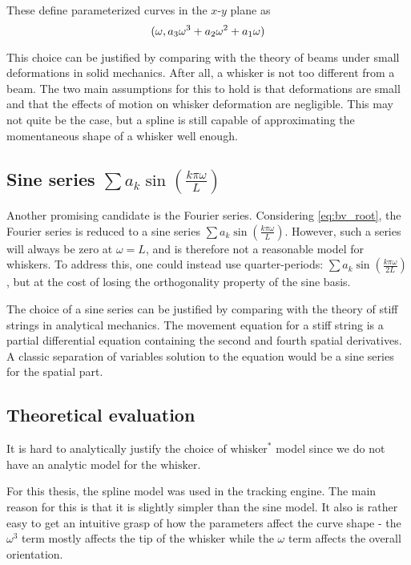 These define parameterized curves in the $x$-$y$ plane as
\begin{equation}
  (\omega,a_3\omega^3+a_2\omega^2+a_1\omega)
\end{equation}

This choice can be justified by comparing with the theory of beams
under small deformations in solid mechanics. After all, a whisker is
not too different from a beam. The two main assumptions for this to
hold is that deformations are small and that the effects of motion on
whisker deformation are negligible. \cite{Hallfasthet} This may not
quite be the case, but a spline is still capable of approximating the
momentaneous shape of a whisker well enough.

\subsection{Sine series $\sum a_k\sin \left(\frac{k\pi\omega}{L}\right)$}
Another promising candidate is the Fourier series. Considering
\eqref{eq:bv_root}, the Fourier series is reduced to a sine series
$\sum a_k\sin \left(\frac{k\pi\omega}{L}\right)$. However, such a
series will always be zero at $\omega = L$, and is therefore not a
reasonable model for whiskers. To address this, one could instead use
quarter-periods: $\sum a_k \sin\left( \frac{k\pi\omega}{2L}\right)$,
but at the cost of losing the orthogonality property of the sine
basis.

The choice of a sine series can be justified by comparing with the
theory of stiff strings in analytical mechanics. The movement equation
for a stiff string is a partial differential equation containing the
second and fourth spatial derivatives. A classic separation of
variables solution to the equation would be a sine series for the
spatial part.

\subsection{Theoretical evaluation}

It is hard to analytically justify the choice of $\text{whisker}^*$
model since we do not have an analytic model for the $\text{whisker}$.

For this thesis, the spline model was used in the tracking engine. The
main reason for this is that it is slightly simpler than the sine
model. It also is rather easy to get an intuitive grasp of how the
parameters affect the curve shape - the $\omega^3$ term mostly affects
the tip of the whisker while the $\omega$ term affects the overall
orientation.
